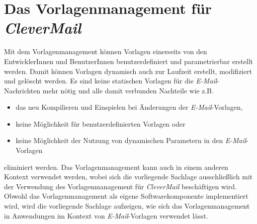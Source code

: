 \section{Das Vorlagenmanagement für \emph{CleverMail}}
Mit dem Vorlagenmanagement können Vorlagen einerseits von den EntwicklerInnen und BenutzerInnen benutzerdefiniert und parametrierbar erstellt werden. Damit können Vorlagen dynamisch auch zur Laufzeit erstellt, modifiziert und gelöscht werden. Es sind keine statischen Vorlagen für die \emph{E-Mail}-Nachrichten mehr nötig und alle damit verbunden Nachteile wie z.B. 
\begin{itemize}
	\item das neu Kompilieren und Einspielen bei Änderungen der \emph{E-Mail}-Vorlagen,
	\item keine Möglichkeit für benutzerdefinierten Vorlagen oder
	\item keine Möglichkeit der Nutzung von dynamischen Parametern in den \emph{E-Mail}-Vorlagen
\end{itemize}
eliminiert werden. Das Vorlagenmanagement kann auch in einem anderen Kontext verwendet werden, wobei sich die vorliegende Sachlage ausschließlich mit der Verwendung des Vorlagenmanagement für \emph{CleverMail} beschäftigen wird. Obwohl das Vorlagenmanagement als eigene Softwarekomponente implementiert wird, wird die vorliegende Sachlage aufzeigen, wie sich das Vorlagenmanagement in Anwendungen im Kontext von \emph{E-Mail}-Vorlagen verwendet lässt. 
\newpage

